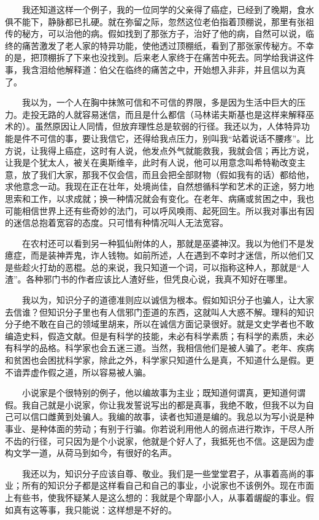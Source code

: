 　　我还知道这样一个例子，我的一位同学的父亲得了癌症，已经到了晚期，食水俱不能下，静脉都已扎硬。就在弥留之际，忽然这位老伯指着顶棚说，那里有张祖传的秘方，可以治他的病。假如找到了那张方子，治好了他的病，自然可以说，临终的痛苦激发了老人家的特异功能，使他透过顶棚纸，看到了那张家传秘方。不幸的是，把顶棚拆了下来也没找到。后来老人家终于在痛苦中死去。同学给我讲这件事，我含泪给他解释道：伯父在临终的痛苦之中，开始想入非非，并且信以为真了。 

　　我以为，一个人在胸中抹煞可信和不可信的界限，多是因为生活中巨大的压力。走投无路的人就容易迷信，而且是什么都信（马林诺夫斯基也是这样来解释巫术的）。虽然原因让人同情，但放弃理性总是软弱的行径。我还以为，人体特异功能是件不可信的事，要让我信它，还得给我点压力，别叫我“站着说话不腰疼”。比方说，让我得上癌症，这时有人说，他发点外气就能救我，我就会信；再比方说，让我是个犹太人，被关在奥斯维辛，此时有人说，他可以用意念叫希特勒改变主意，放了我们大家，那我不仅会信，而且会把全部财物（假如我有的话）都给他，求他意念一动。我现在正在壮年，处境尚佳，自然想循科学和艺术的正途，努力地思索和工作，以求成就；换一种情况就会有变化。在老年、病痛或贫困之中，我也可能相信世界上还有些奇妙的法门，可以呼风唤雨、起死回生。所以我对事出有因的迷信总抱着宽容的态度。只可惜有种情况叫人无法宽容。 

　　在农村还可以看到另一种狐仙附体的人，那就是巫婆神汉。我以为他们不是发癔症，而是装神弄鬼，诈人钱物。如前所述，人在遇到不幸时才迷信，所以他们又是些趁火打劫的恶棍。总的来说，我只知道一个词，可以指称这种人，那就是“人渣”。各种邪门书的作者应该比人渣好些，但凭良心说，我真不知好在哪里。 

　　我以为，知识分子的道德准则应以诚信为根本。假如知识分子也骗人，让大家去信谁？但知识分子里也有人信邪门歪道的东西，这就叫人大惑不解。理科的知识分子绝不敢在自己的领域里胡来，所以在诚信方面记录很好。就是文史学者也不敢编造史料，假造文献。但是有科学的技能，未必有科学素质；有科学的素质，未必有科学的品格。科学家也会五迷三道。当然，我相信他们是被人骗了。老年、疾病和贫困也会困扰科学家，除此之外，科学家只知道什么是真，不知道什么是假。更不谙弄虚作假之道，所以容易被人骗。 

　　小说家是个很特别的例子，他以编故事为主业；既知道何谓真，更知道何谓假。我自己就是小说家，你让我发誓说写出的都是真事，我绝不敢，但我不以为自己可以信口雌黄到处骗人。我编的故事，读者也知道是编的。我总以为写小说是种事业、是种体面的劳动；有别于行骗。你若说利用他人的弱点进行欺诈，干尽人所不齿的行径，可只因为是个小说家，他就是个好人了，我抵死也不信。这是因为虚构文学一道，从荷马到如今，有很好的名声。 

　　我还以为，知识分子应该自尊、敬业。我们是一些堂堂君子，从事着高尚的事业；所有的知识分子都是这样看自己和自己的事业，小说家也不该例外。现在市面上有些书，使我怀疑某人是这么想的：我就是个卑鄙小人，从事着龌龊的事业。假如真有这等事，我只能说：这样想是不好的。 

